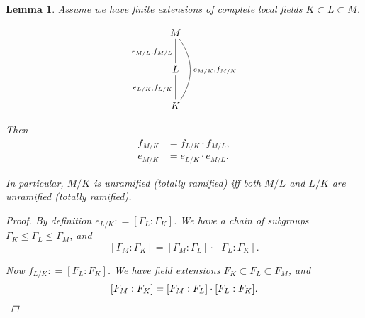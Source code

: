 \documentclass{article}
\newcommand{\dfn}{\mathrel{\mathop:}=}
\theoremstyle{myplain}
\newtheorem{lemma}[proposition]{Lemma}
\theoremstyle{mydefinition}
\begin{document}
\begin{lemma}\label{lemma:fk-multiplicative}
  Assume we have finite extensions of complete local fields
  $K \subset L \subset M$.

  \[ \xymatrix{
      M\ar@{-}[d]_{e_{M/L}, f_{M/L}} \ar@/^1.5em/@{-}[dd]^{e_{M/K}, f_{M/K}} \\
      L\ar@{-}[d]_{e_{L/K}, f_{L/K}} \\
      K
    } \]

  Then
  \begin{align*}
    f_{M/K} & = f_{L/K} \cdot f_{M/L},\\
    e_{M/K} & = e_{L/K} \cdot e_{M/L}.
  \end{align*}

  In particular, $M/K$ is unramified (totally ramified) iff both $M/L$ and $L/K$
  are unramified (totally ramified).

  \begin{proof}
    By definition $e_{L/K} \dfn [\Gamma_L : \Gamma_K]$. We have a chain of
    subgroups $\Gamma_K \le \Gamma_L \le \Gamma_M$, and
    $$[\Gamma_M : \Gamma_K] = [\Gamma_M : \Gamma_L] \cdot [\Gamma_L : \Gamma_K].$$

    Now $f_{L/K} \dfn [F_L : F_K]$. We have field extensions
    $F_K \subset F_L \subset F_M$, and
    \[ [F_M : F_K] = [F_M : F_L] \cdot [F_L : F_K]. \qedhere \]
  \end{proof}
\end{lemma}
\end{document}
